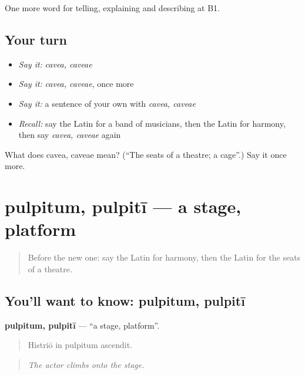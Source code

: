\begin{grammarlens}[title={What you've built}]
One more word for telling, explaining and describing at B1.
\end{grammarlens}

\subsection*{Your turn}
\begin{itemize}
\raggedright
  \item \emph{Say it:} \emph{cavea, caveae}
  \item \emph{Say it:} \emph{cavea, caveae}, once more
  \item \emph{Say it:} a sentence of your own with \emph{cavea, caveae}
  \item \emph{Recall:} say the Latin for a band of musicians, then the Latin for harmony, then say \emph{cavea, caveae} again
\end{itemize}

\begin{tcolorbox}[breakable,colback=teal!4,colframe=teal!35!black,title={Before you move on}]
What does cavea, caveae mean? (\textquotedblleft{}The seats of a theatre; a cage\textquotedblright{}.) Say it once more.
\end{tcolorbox}
\section[pulpitum, pulpitī]{pulpitum, pulpitī — a stage, platform}

\label{lesson:LA-C546-pulpitum}



\begin{quote}
Before the new one: say the Latin for harmony, then the Latin for the seats of a theatre.
\end{quote}

\subsection*{You'll want to know: pulpitum, pulpitī}
\textbf{pulpitum, pulpitī} — \textquotedblleft{}a stage, platform\textquotedblright{}.

\begin{quote}
Histriō in pulpitum ascendit.
\end{quote}

\begin{quote}
\emph{The actor climbs onto the stage.}
\end{quote}

